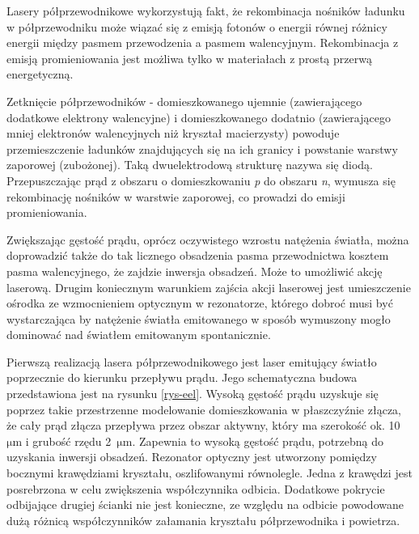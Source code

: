 \documentclass[a4paper,10pt,twoside]{report}
\begin{document}
Lasery półprzewodnikowe wykorzystują fakt, że rekombinacja nośników ładunku w półprzewodniku może wiązać się z emisją fotonów o energii równej różnicy energii między pasmem przewodzenia a pasmem walencyjnym. Rekombinacja z emisją promieniowania jest możliwa tylko w materiałach z prostą przerwą energetyczną.


Zetknięcie półprzewodników - domieszkowanego ujemnie (zawierającego dodatkowe elektrony walencyjne) i domieszkowanego dodatnio (zawierającego mniej elektronów walencyjnych niż kryształ macierzysty) powoduje przemieszczenie ładunków znajdujących się na ich granicy i powstanie warstwy zaporowej (zubożonej). Taką dwuelektrodową strukturę nazywa się diodą. Przepuszczając prąd z obszaru o domieszkowaniu \textit{p} do obszaru \textit{n}, wymusza się rekombinację nośników w warstwie zaporowej, co prowadzi do emisji promieniowania.  

Zwiększając gęstość prądu, oprócz oczywistego wzrostu natężenia światła, można doprowadzić także do tak licznego obsadzenia pasma przewodnictwa kosztem pasma walencyjnego, że zajdzie inwersja obsadzeń. Może to umożliwić akcję laserową. Drugim koniecznym warunkiem zajścia akcji laserowej jest umieszczenie ośrodka ze wzmocnieniem optycznym w rezonatorze, którego dobroć musi być wystarczająca by natężenie światła emitowanego w sposób wymuszony mogło dominować nad światłem emitowanym spontanicznie.

Pierwszą realizacją lasera półprzewodnikowego jest laser emitujący światło poprzecznie do kierunku przepływu prądu. Jego schematyczna budowa przedstawiona jest na rysunku \ref{rys-eel}. Wysoką gęstość prądu uzyskuje się poprzez takie przestrzenne modelowanie domieszkowania w płaszczyźnie złącza, że cały prąd złącza przepływa przez obszar aktywny, który ma szerokość ok. 10~$\mathrm{\mu m}$ i grubość rzędu 2~$\mathrm{\mu m}$. Zapewnia to wysoką gęstość prądu, potrzebną do uzyskania inwersji obsadzeń. Rezonator optyczny jest utworzony pomiędzy bocznymi krawędziami kryształu, oszlifowanymi równolegle. Jedna z krawędzi jest posrebrzona w celu zwiększenia współczynnika odbicia. Dodatkowe pokrycie odbijające drugiej ścianki nie jest konieczne, ze względu na odbicie powodowane dużą różnicą współczynników załamania kryształu półprzewodnika i powietrza.
\end{document}
